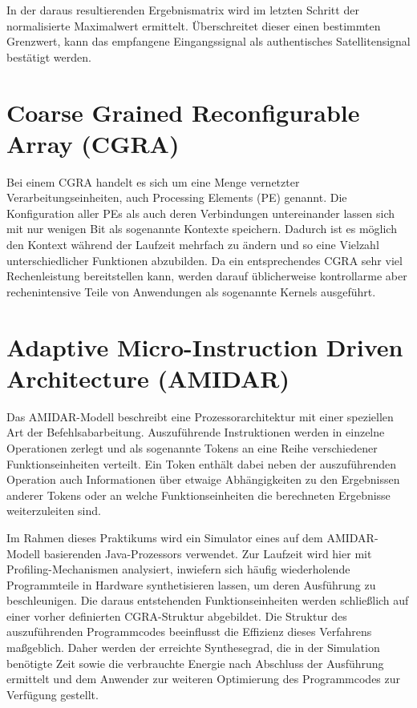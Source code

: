 \documentclass[parskip,
							 oneside,
							 11pt,
							 noheadingspace,
							 accentcolor=tud1d,
							 bigchapter,
							 colorback]{tudreport}
\begin{document}
In der daraus resultierenden Ergebnismatrix wird im letzten Schritt der normalisierte Maximalwert ermittelt. Überschreitet dieser einen bestimmten Grenzwert, kann das empfangene Eingangssignal als authentisches Satellitensignal bestätigt werden.

\section{Coarse Grained Reconfigurable Array (CGRA)}
Bei einem CGRA handelt es sich um eine Menge vernetzter Verarbeitungseinheiten, auch Processing Elements (PE) genannt. Die Konfiguration aller PEs als auch deren Verbindungen untereinander lassen sich mit nur wenigen Bit als sogenannte Kontexte speichern. Dadurch ist es möglich den Kontext während der Laufzeit mehrfach zu ändern und so eine Vielzahl unterschiedlicher Funktionen abzubilden. Da ein entsprechendes CGRA sehr viel Rechenleistung bereitstellen kann, werden darauf üblicherweise kontrollarme aber rechenintensive Teile von Anwendungen als sogenannte Kernels ausgeführt.  

\section{Adaptive Micro-Instruction Driven Architecture (AMIDAR)}
Das AMIDAR-Modell beschreibt eine Prozessorarchitektur mit einer speziellen Art der Befehlsabarbeitung. Auszuführende Instruktionen werden in einzelne Operationen zerlegt und als sogenannte Tokens an eine Reihe verschiedener Funktionseinheiten verteilt. Ein Token enthält dabei neben der auszuführenden Operation auch Informationen über etwaige Abhängigkeiten zu den Ergebnissen anderer Tokens oder an welche Funktionseinheiten die berechneten Ergebnisse weiterzuleiten sind. 

Im Rahmen dieses Praktikums wird ein Simulator eines auf dem AMIDAR-Modell basierenden Java-Prozessors verwendet. Zur Laufzeit wird hier mit Profiling-Mechanismen analysiert, inwiefern sich häufig wiederholende Programmteile in Hardware synthetisieren lassen, um deren Ausführung zu beschleunigen. Die daraus entstehenden Funktionseinheiten werden schließlich auf einer vorher definierten CGRA-Struktur abgebildet. Die Struktur des auszuführenden Programmcodes beeinflusst die Effizienz dieses Verfahrens maßgeblich. Daher werden der erreichte Synthesegrad, die in der Simulation benötigte Zeit sowie die verbrauchte Energie nach Abschluss der Ausführung ermittelt und dem Anwender zur weiteren Optimierung des Programmcodes zur Verfügung gestellt.
\end{document}
